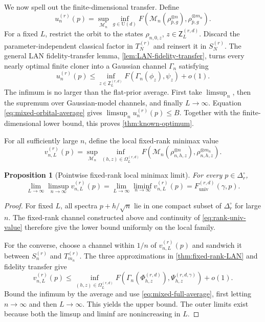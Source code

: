 \documentclass[11pt]{article}
\newtheorem{proposition}[proposition]{Proposition}
\theoremstyle{remark}
\theoremstyle{plain}
\newcommand{\cM}{\mathcal M}
\newcommand{\U}{\mathrm U}
\newcommand{\ot}{\otimes}
\newcommand{\Funiv}{F_{\mathrm{univ}}}
\begin{document}
We now spell out the finite-dimensional transfer.  Define
\begin{equation}
  u_n^{(r)}(p)=\sup_{\cM_n}\inf_{g\in\U(d)}
  F\!\left(\cM_n(\rho_{\bar p,g}^{\ot n}),
             \rho_{\bar p,g}^{\ot m_n}\right).
  \label{eq:rank-known-minimax}
\end{equation}
For a fixed \(L\), restrict the orbit to the states
\(\rho_{n,0,z}\), \(z\in\mathsf Z_L^{(r,d)}\).  Discard the
parameter-independent classical factor in \(T_N^{(r)}\) and reinsert it in
  \(S_N^{(r)}\).  The general LAN fidelity-transfer lemma,
\cref{lem:LAN-fidelity-transfer},
turns every nearly optimal finite cloner into a Gaussian channel
\(\Gamma_n\) satisfying
\[
  u_n^{(r)}(p)
  \le\inf_{z\in\mathsf Z_L^{(r,d)}}
       F(\Gamma_n(\phi_z),\psi_z)+o(1).
\]
The infimum is no larger than the flat-prior average.  First take
\(\limsup_n\), then the supremum over Gaussian-model channels, and finally
\(L\to\infty\).  Equation \eqref{eq:mixed-orbital-average} gives
\(\limsup_n u_n^{(r)}(p)\le B\).  Together with the finite-dimensional lower
bound, this proves \cref{thm:known-optimum}.

For all sufficiently large \(n\), define the local fixed-rank minimax value
\begin{equation}
  v_{n,L}^{(r)}(p)
  =\sup_{\cM_n}\inf_{(h,z)\in\Omega_L^{(r,d)}}
  F\!\left(\cM_n(\rho_{n,h,z}^{\ot n}),
             \rho_{n,h,z}^{\ot m_n}\right).
  \label{eq:rank-local-minimax}
\end{equation}

\begin{proposition}[Pointwise fixed-rank local minimax limit]
\label{prop:rank-local-minimax}
For every \(p\in\Delta_r^\circ\),
\[
  \lim_{L\to\infty}\limsup_{n\to\infty}v_{n,L}^{(r)}(p)
  =\lim_{L\to\infty}\liminf_{n\to\infty}v_{n,L}^{(r)}(p)
  =\Funiv^{(r,d)}(\gamma,p).
\]
\end{proposition}

\begin{proof}
For fixed \(L\), all spectra \(p+h/\sqrt n\) lie in one compact subset of
  \(\Delta_r^\circ\) for large \(n\).  The fixed-rank channel constructed
  above and continuity of \eqref{eq:rank-univ-value} therefore give the
lower bound uniformly on the local family.

For the converse, choose a channel within \(1/n\) of
\(v_{n,L}^{(r)}(p)\) and sandwich it between \(S_n^{(r)}\) and
\(T_{m_n}^{(r)}\).  The three approximations in
\cref{thm:fixed-rank-LAN} and fidelity transfer give
\[
  v_{n,L}^{(r)}(p)
  \le\inf_{(h,z)\in\Omega_L^{(r,d)}}
  F\!\left(\Gamma_n(\Phi_{h,z}^{(r,d)}),
             \Psi_{h,z}^{(r,d,\gamma)}\right)+o(1).
\]
Bound the infimum by the average and use
\eqref{eq:mixed-full-average}, first letting \(n\to\infty\) and then
\(L\to\infty\).  This yields the upper bound.  The outer limits exist
because both the limsup and liminf are nonincreasing in \(L\).
\end{proof}
\end{document}
